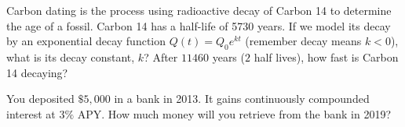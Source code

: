 \documentclass[12pt, a4paper]{article}
\begin{document}
\vspace{-0.5in}
\begin{ex}
  Carbon dating is the process using radioactive decay of Carbon 14 to
  determine the age of a fossil. Carbon 14 has a half-life of 5730
  years. If we model its decay by an exponential decay function \(Q(t)
  = Q_0 e^{kt}\) (remember decay means \(k < 0\)), what is its decay constant, \(k\)? After \(11460\)
  years (\(2\) half lives), how fast is Carbon 14 decaying?
\end{ex}
\vspace{1.0in}
\begin{ex}
  You deposited $\$5{,}000$ in a bank in 2013.  It gains continuously compounded interest at $3\%$ APY.  How much money will you retrieve from the bank in 2019?
\end{ex}
\end{document}
